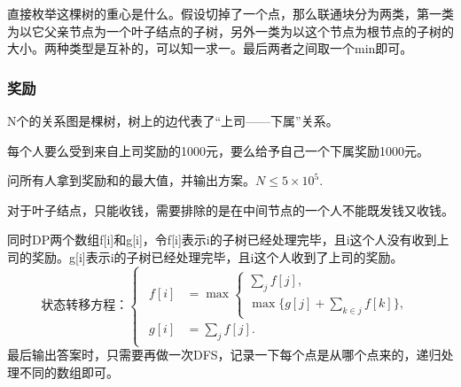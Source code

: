 直接枚举这棵树的重心是什么。假设切掉了一个点，那么联通块分为两类，第一类为以它父亲节点为一个叶子结点的子树，另外一类为以这个节点为根节点的子树的大小。两种类型是互补的，可以知一求一。最后两者之间取一个min即可。
\subsubsection{奖励}
N个的关系图是棵树，树上的边代表了“上司——下属”关系。

每个人要么受到来自上司奖励的1000元，要么给予自己一个下属奖励1000元。

问所有人拿到奖励和的最大值，并输出方案。$N\le 5\times 10^5$.

对于叶子结点，只能收钱，需要排除的是在中间节点的一个人不能既发钱又收钱。

同时DP两个数组f[i]和g[i]，令f[i]表示i的子树已经处理完毕，且i这个人没有收到上司的奖励。g[i]表示i的子树已经处理完毕，且i这个人收到了上司的奖励。
\begin{equation*}
    状态转移方程：
    \begin{cases}
        \begin{aligned}
            f[i]&=\max
            \begin{cases}
                \sum_jf[j],\\
                \max\{g[j]+\sum_{k\in j}f[k]\},
            \end{cases}
            \\
            g[i]&=\sum_jf[j].
        \end{aligned}
    \end{cases}
\end{equation*}
最后输出答案时，只需要再做一次DFS，记录一下每个点是从哪个点来的，递归处理不同的数组即可。
